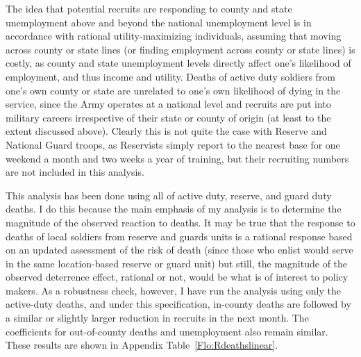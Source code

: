 \documentclass[12pt] {article}
\begin{document}


The idea that potential recruits are responding to county and state
unemployment above and beyond the national unemployment level is in
accordance with rational utility-maximizing individuals, assuming
that moving across county or state lines (or finding employment across
county or state lines) is costly, as county and state unemployment
levels directly affect one's likelihood of employment, and thus income
and utility. Deaths of active duty soldiers from one's own county
or state are unrelated to one's own likelihood of dying in the service,
since the Army operates at a national level and recruits are put into
military careers irrespective of their state or county of origin (at
least to the extent discussed above). Clearly this is not quite the
case with Reserve and National Guard troops, as Reservists simply
report to the nearest base for one weekend a month and two weeks
a year of training, but their recruiting numbers are not included
in this analysis.


This analysis has been done using all of active duty, reserve, and
guard duty deaths. I do this because the main emphasis of my analysis
is to determine the magnitude of the observed reaction to deaths.
It may be true that the response to deaths of local soldiers from
reserve and guards units is a rational response based on an updated
assessment of the risk of death (since those who enlist would serve in the same location-based reserve or guard unit) but still, the magnitude of the observed
deterrence effect, rational or not, would be what is of interest to
policy makers. As a robustness check, however, I have run the analysis
using only the active-duty deaths, and under this specification, in-county
deaths are followed by a similar or slightly larger reduction in recruits in the
next month. The coefficients for out-of-county deaths and unemployment also
remain similar. These results are shown in Appendix Table~\ref{Flo:Rdeathslinear}. 
\end{document}

